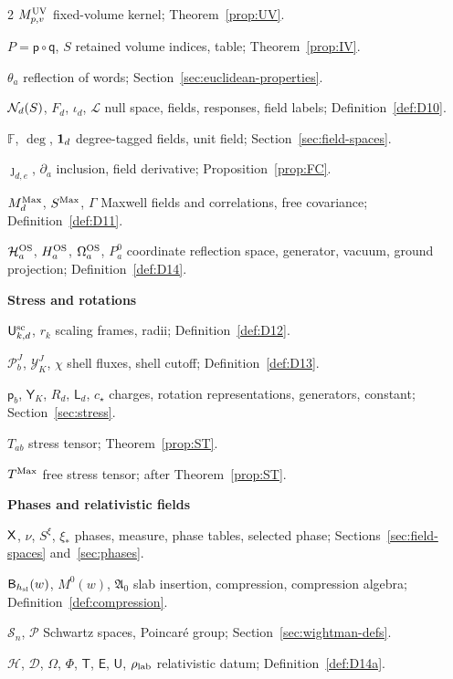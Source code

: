\begin{multicols}{2}
$M^{\rm UV}_{p,v}$ fixed-volume kernel; Theorem~\ref{prop:UV}.

$P=\mathsf p\circ\mathsf q$, $S$ retained volume indices, table; Theorem~\ref{prop:IV}.

$\theta_a$ reflection of words; Section~\ref{sec:euclidean-properties}.

$\mathcal{N}_{d}(S)$, $F_d$, $\iota_d$, $\mathcal L$ null space, fields, responses, field labels; Definition~\ref{def:D10}.

$\mathbb F$, $\deg$, $\mathbf{1}_{d}$ degree-tagged fields, unit field; Section~\ref{sec:field-spaces}.

$\jmath_{d,e}$, $\partial_a$ inclusion, field derivative; Proposition~\ref{prop:FC}.

$M_{d}^{\mathrm{Max}}$, $S^{\mathrm{Max}}$, $\Gamma$ Maxwell fields and correlations, free covariance; Definition~\ref{def:D11}.

$\mathcal H_a^{\rm OS}$, $H_a^{\rm OS}$, $\Omega_a^{\rm OS}$, $P^0_a$ coordinate reflection space, generator, vacuum, ground projection; Definition~\ref{def:D14}.

\medskip\textbf{Stress and rotations}\par
$\mathsf{U}_{k,d}^{\mathrm{sc}}$, $r_k$ scaling frames, radii; Definition~\ref{def:D12}.

$\mathcal P_b^J$, $\mathcal Y_{K}^J$, $\chi$ shell fluxes, shell cutoff; Definition~\ref{def:D13}.

$\mathsf p_b$, $\mathsf Y_K$, $R_d$, $\mathsf L_d$, $c_\star$ charges, rotation representations, generators, constant; Section~\ref{sec:stress}.

$T_{ab}$ stress tensor; Theorem~\ref{prop:ST}.

$T^{\mathrm{Max}}$ free stress tensor; after Theorem~\ref{prop:ST}.

\medskip\textbf{Phases and relativistic fields}\par
$\mathsf{X}$, $\nu$, $S^\xi$, $\xi_*$ phases, measure, phase tables, selected phase; Sections~\ref{sec:field-spaces} and~\ref{sec:phases}.

$\mathsf B_{h_{\rm sl}}(w)$, $M^0(w)$, $\mathfrak A_0$ slab insertion, compression, compression algebra; Definition~\ref{def:compression}.

$\mathcal S_n$, $\mathcal P$ Schwartz spaces, Poincar\'e group; Section~\ref{sec:wightman-defs}.

$\mathcal H$, $\mathcal D$, $\Omega$, $\Phi$, $\mathsf T$, $\mathsf E$, $\mathsf U$, $\rho_{\rm lab}$ relativistic datum; Definition~\ref{def:D14a}.


\end{multicols}
